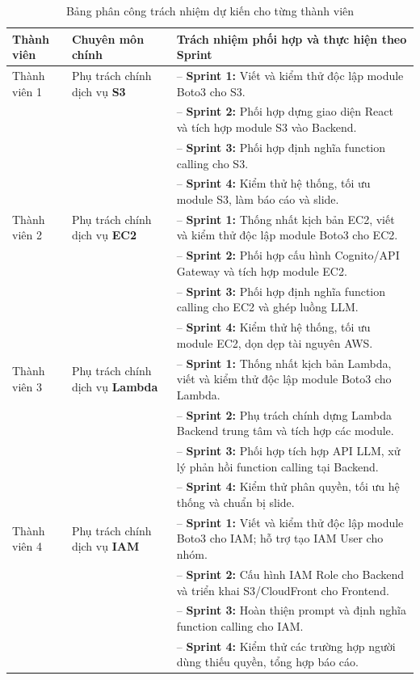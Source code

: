 \documentclass[a4paper,12pt]{article}
\newcommand{\bangfont}{\fontsize{12}{15}\selectfont}
\begin{document}
\begin{table}[htbp]
\centering
\caption{Bảng phân công trách nhiệm dự kiến cho từng thành viên}
\label{tab:phancong}
\bangfont
\begin{tabularx}{\linewidth}{@{}p{3cm}p{4.5cm}Y@{}}
\toprule
\textbf{Thành viên} & \textbf{Chuyên môn chính} & \textbf{Trách nhiệm phối hợp và thực hiện theo Sprint}\\
\midrule
Thành viên 1 & Phụ trách chính dịch vụ \textbf{S3} & -- \textbf{Sprint 1:} Viết và kiểm thử độc lập module Boto3 cho S3.\\
& & -- \textbf{Sprint 2:} Phối hợp dựng giao diện React và tích hợp module S3 vào Backend.\\
& & -- \textbf{Sprint 3:} Phối hợp định nghĩa function calling cho S3.\\
& & -- \textbf{Sprint 4:} Kiểm thử hệ thống, tối ưu module S3, làm báo cáo và slide.\\
\midrule
Thành viên 2 & Phụ trách chính dịch vụ \textbf{EC2} & -- \textbf{Sprint 1:} Thống nhất kịch bản EC2, viết và kiểm thử độc lập module Boto3 cho EC2.\\
& & -- \textbf{Sprint 2:} Phối hợp cấu hình Cognito/API Gateway và tích hợp module EC2.\\
& & -- \textbf{Sprint 3:} Phối hợp định nghĩa function calling cho EC2 và ghép luồng LLM.\\
& & -- \textbf{Sprint 4:} Kiểm thử hệ thống, tối ưu module EC2, dọn dẹp tài nguyên AWS.\\
\midrule
Thành viên 3 & Phụ trách chính dịch vụ \textbf{Lambda} & -- \textbf{Sprint 1:} Thống nhất kịch bản Lambda, viết và kiểm thử độc lập module Boto3 cho Lambda.\\
& & -- \textbf{Sprint 2:} Phụ trách chính dựng Lambda Backend trung tâm và tích hợp các module.\\
& & -- \textbf{Sprint 3:} Phối hợp tích hợp API LLM, xử lý phản hồi function calling tại Backend.\\
& & -- \textbf{Sprint 4:} Kiểm thử phân quyền, tối ưu hệ thống và chuẩn bị slide.\\
\midrule
Thành viên 4 & Phụ trách chính dịch vụ \textbf{IAM} & -- \textbf{Sprint 1:} Viết và kiểm thử độc lập module Boto3 cho IAM; hỗ trợ tạo IAM User cho nhóm.\\
& & -- \textbf{Sprint 2:} Cấu hình IAM Role cho Backend và triển khai S3/CloudFront cho Frontend.\\
& & -- \textbf{Sprint 3:} Hoàn thiện prompt và định nghĩa function calling cho IAM.\\
& & -- \textbf{Sprint 4:} Kiểm thử các trường hợp người dùng thiếu quyền, tổng hợp báo cáo.\\
\bottomrule
\end{tabularx}
\end{table}
\end{document}

